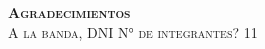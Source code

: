 \Huge
\scshape
\textbf{Agradecimientos}\\

\normalsize\normalfont
A la banda, DNI N° de integrantes? 11